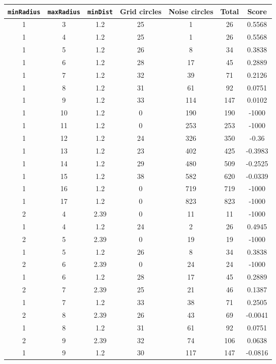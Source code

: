 \documentclass[letterpaper, 12pt]{article}
\begin{document}
\begin{longtable}{|c|c|c|c|c|c|c|}
\hline
\textbf{\texttt{minRadius}} & \textbf{\texttt{maxRadius}} & \textbf{\texttt{minDist}} & \textbf{Grid circles} & \textbf{Noise circles} & \textbf{Total} & \textbf{Score} \\
\hline
1 & 3 & 1.2 & 25 & 1 & 26 & 0.5568 \\
\hline
1 & 4 & 1.2 & 25 & 1 & 26 & 0.5568 \\
\hline
1 & 5 & 1.2 & 26 & 8 & 34 & 0.3838 \\
\hline
1 & 6 & 1.2 & 28 & 17 & 45 & 0.2889 \\
\hline
1 & 7 & 1.2 & 32 & 39 & 71 & 0.2126 \\
\hline
1 & 8 & 1.2 & 31 & 61 & 92 & 0.0751 \\
\hline
1 & 9 & 1.2 & 33 & 114 & 147 & 0.0102 \\
\hline
1 & 10 & 1.2 & 0 & 190 & 190 & -1000 \\
\hline
1 & 11 & 1.2 & 0 & 253 & 253 & -1000 \\
\hline
1 & 12 & 1.2 & 24 & 326 & 350 & -0.36 \\
\hline
1 & 13 & 1.2 & 23 & 402 & 425 & -0.3983 \\
\hline
1 & 14 & 1.2 & 29 & 480 & 509 & -0.2525 \\
\hline
1 & 15 & 1.2 & 38 & 582 & 620 & -0.0339 \\
\hline
1 & 16 & 1.2 & 0 & 719 & 719 & -1000 \\
\hline
1 & 17 & 1.2 & 0 & 823 & 823 & -1000 \\
\hline
2 & 4 & 2.39 & 0 & 11 & 11 & -1000 \\
\hline
1 & 4 & 1.2 & 24 & 2 & 26 & 0.4945 \\
\hline
2 & 5 & 2.39 & 0 & 19 & 19 & -1000 \\
\hline
1 & 5 & 1.2 & 26 & 8 & 34 & 0.3838 \\
\hline
2 & 6 & 2.39 & 0 & 24 & 24 & -1000 \\
\hline
1 & 6 & 1.2 & 28 & 17 & 45 & 0.2889 \\
\hline
2 & 7 & 2.39 & 25 & 21 & 46 & 0.1387 \\
\hline
1 & 7 & 1.2 & 33 & 38 & 71 & 0.2505 \\
\hline
2 & 8 & 2.39 & 26 & 43 & 69 & -0.0041 \\
\hline
1 & 8 & 1.2 & 31 & 61 & 92 & 0.0751 \\
\hline
2 & 9 & 2.39 & 32 & 74 & 106 & 0.0638 \\
\hline
1 & 9 & 1.2 & 30 & 117 & 147 & -0.0816 \\

\end{longtable}
\end{document}
